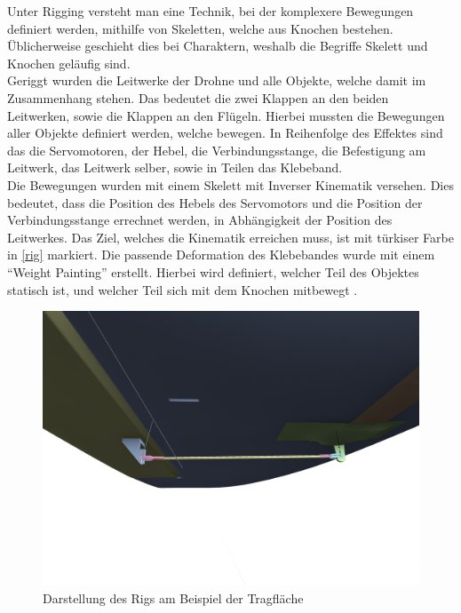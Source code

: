 Unter Rigging versteht man eine Technik, bei der komplexere Bewegungen definiert werden, mithilfe von Skeletten, welche aus Knochen bestehen. Üblicherweise geschieht dies bei Charaktern, weshalb die Begriffe Skelett und Knochen geläufig sind. \cite{rigging}\\
Geriggt wurden die Leitwerke der Drohne und alle Objekte, welche damit im Zusammenhang stehen. Das bedeutet die zwei Klappen an den beiden Leitwerken, sowie die Klappen an den Flügeln. Hierbei mussten die Bewegungen aller Objekte definiert werden, welche bewegen. In Reihenfolge des Effektes sind das die Servomotoren, der Hebel, die Verbindungsstange, die Befestigung am Leitwerk, das Leitwerk selber, sowie in Teilen das Klebeband.\\
Die Bewegungen wurden mit einem Skelett mit Inverser Kinematik versehen. Dies bedeutet, dass die Position des Hebels des Servomotors und die Position der Verbindungsstange errechnet werden, in Abhängigkeit der Position des Leitwerkes. Das Ziel, welches die Kinematik erreichen muss, ist mit türkiser Farbe in \autoref{rig} markiert. Die passende Deformation des Klebebandes wurde mit einem ``Weight Painting'' erstellt. Hierbei wird definiert, welcher Teil des Objektes statisch ist, und welcher Teil sich mit dem Knochen mitbewegt \cite{weight_paint}.

\begin{figure}[H]
\begin{center}
\includegraphics[width=\textwidth]{gfx/prod/plane/plane7.jpg}
\caption{Darstellung des Rigs am Beispiel der Tragfläche}
\label{rig}
\end{center}
\end{figure}

